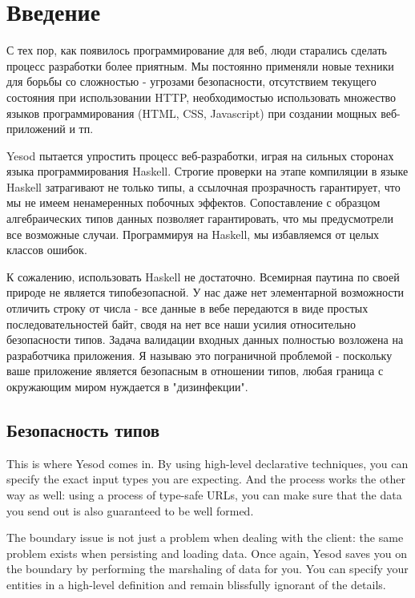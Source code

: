 \chapter{Введение}

С тех пор, как появилось программирование для веб, люди старались сделать процесс разработки более приятным. Мы постоянно применяли новые техники для борьбы со сложностью - угрозами безопасности, отсутствием текущего состояния при использовании HTTP, необходимостью использовать множество языков программирования (HTML, CSS, Javascript) при создании мощных веб-приложений и тп.

Yesod пытается упростить процесс веб-разработки, играя на сильных сторонах языка программирования Haskell. Строгие проверки на этапе компиляции в языке Haskell затрагивают не только типы, а ссылочная прозрачность гарантирует, что мы не имеем ненамеренных побочных эффектов. Сопоставление с образцом алгебраических типов данных позволяет гарантировать, что мы предусмотрели все возможные случаи. Программируя на Haskell, мы избавляемся от целых классов ошибок.

К сожалению, использовать Haskell не достаточно. Всемирная паутина по своей природе не является типобезопасной. У нас даже нет элементарной возможности отличить строку от числа - все данные в вебе передаются в виде простых последовательностей байт, сводя на нет все наши усилия относительно безопасности типов. Задача валидации входных данных полностью возложена на разработчика приложения. Я называю это пограничной проблемой - поскольку ваше приложение является безопасным в отношении типов, любая граница с окружающим миром нуждается в "дизинфекции".

\section{Безопасность типов}

This is where Yesod comes in. By using high-level declarative techniques, you can specify the exact input types you are expecting. And the process works the other way as well: using a process of type-safe URLs, you can make sure that the data you send out is also guaranteed to be well formed.

The boundary issue is not just a problem when dealing with the client: the same problem exists when persisting and loading data. Once again, Yesod saves you on the boundary by performing the marshaling of data for you. You can specify your entities in a high-level definition and remain blissfully ignorant of the details.


